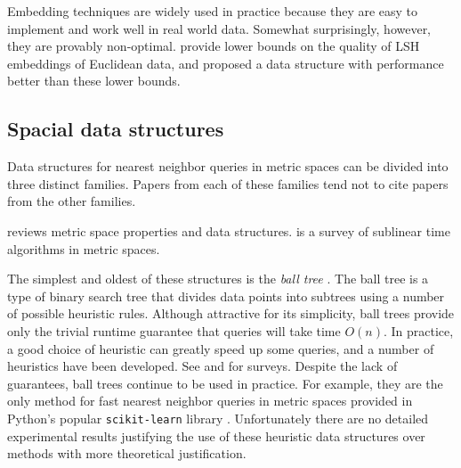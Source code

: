 \documentclass[../main.tex]{subfiles}
\begin{document}
Embedding techniques are widely used in practice because they are easy to implement and work well in real world data.
Somewhat surprisingly, however, they are provably non-optimal.
\cite{o2014optimal} provide lower bounds on the quality of LSH embeddings of Euclidean data,
and \cite{andoni2014beyond} proposed a data structure with performance better than these lower bounds.


\subsection{Spacial data structures}

Data structures for nearest neighbor queries in metric spaces can be divided into three distinct families. 
Papers from each of these families tend not to cite papers from the other families.

\cite{clarkson2006nearest} reviews metric space properties and data structures.
\cite{czumaj2010sublinear} is a survey of sublinear time algorithms in metric spaces.

The simplest and oldest of these structures is the \emph{ball tree} \citep{omohundro1989}.
The ball tree is a type of binary search tree that divides data points into subtrees using a number of possible heuristic rules.
Although attractive for its simplicity, 
ball trees provide only the trivial runtime guarantee that queries will take time $O(n)$.
In practice, a good choice of heuristic can greatly speed up some queries,
and a number of heuristics have been developed.
See \cite{zezula2006similarity} and \cite{mao2016pivot} for surveys.
Despite the lack of guarantees,
ball trees continue to be used in practice.
For example, they are the only method for fast nearest neighbor queries in metric spaces provided in Python's popular \texttt{scikit-learn} library \citep{scikit-learn}.
Unfortunately there are no detailed experimental results justifying the use of these heuristic data structures over methods with more theoretical justification.
\end{document}
